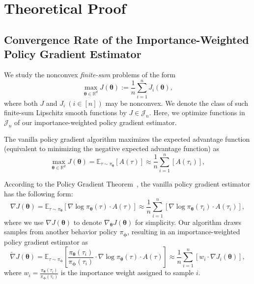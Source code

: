 \section{Theoretical Proof}
\label{app:theory}
\subsection{Convergence Rate of the Importance-Weighted Policy Gradient Estimator}
\label{app:convergence}

We study the nonconvex \emph{finite-sum} problems of the form
\begin{equation}
\max_{\bm{\theta}\in\mathbb{R}^d}J(\bm{\theta}) := \frac{1}{n}\sum_{i=1}^{n}J_i(\bm{\theta}),
\label{obj}
\end{equation}
where both $J$ and $J_i~(i\in[n])$ may be nonconvex.
We denote the class of such finite-sum Lipschitz smooth functions by $J\in\mathcal{J}_n$.
Here, we optimize functions in $\mathcal{J}_n$ of our importance-weighted policy gradient estimator. 

The vanilla policy gradient algorithm maximizes the expected advantage function (equivalent to minimizing the negative expected advantage function) as 
\begin{equation}
\max_{\bm{\theta}\in\mathbb{R}^d}J(\bm{\theta}) = \mathbb{E}_{\tau\sim\pi_{\bm{\theta}}}[A(\tau)]
\approx \frac{1}{n}\sum_{i=1}^{n}\left[A(\tau_i)\right],
\end{equation}

According to the Policy Gradient Theorem~\cite{sutton2018reinforcement}, the vanilla policy gradient estimator has the following form:
\begin{equation}
\nabla J(\bm{\theta}) = \mathbb{E}_{\tau\sim\pi_{\bm{\theta}}}\left[\nabla\log\pi_{\bm{\theta}}(\tau)\cdot A(\tau) \right]
\approx \frac{1}{n}\sum_{i=1}^{n}\left[\nabla\log\pi_{\bm{\theta}}(\tau_i)\cdot A(\tau_i)\right],
\end{equation}
where we use $\nabla J(\bm{\theta})$ to denote $\nabla_{\bm{\theta}} J(\bm{\theta})$ for simplicity. 
Our algorithm draws samples from another behavior policy $\pi_{\bm{\phi}}$, resulting in an importance-weighted policy gradient estimator as
\begin{equation}
\widetilde{\nabla} J(\bm{\theta}) = \mathbb{E}_{\tau\sim\pi_{\bm{\phi}}}\left[\frac{\pi_{\bm{\theta}}(\tau_i)}{\pi_{\bm{\phi}}(\tau_i)}\cdot\nabla\log\pi_{\bm{\theta}}(\tau)\cdot A(\tau) \right]
\approx \frac{1}{n}\sum_{i=1}^{n}\left[w_i\cdot \nabla J_i(\bm{\theta})\right],
\end{equation}
where $w_i=\frac{\pi_{\bm{\theta}}(\tau_i)}{\pi_{\bm{\phi}}(\tau_i)}$ is the importance weight assigned to sample $i$.


